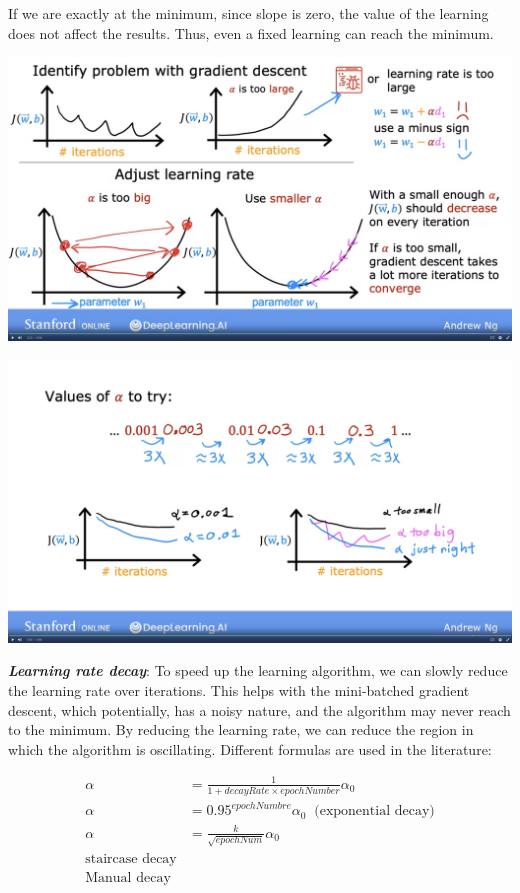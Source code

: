 \documentclass[12pt]{report}
\begin{document}
If we are exactly at the minimum, since slope is zero, the value of the learning does not affect the results. Thus, even a fixed learning can reach the minimum.

\includegraphics[scale=0.12]{pics/LearningRate.png}

\includegraphics[scale=0.12]{pics/learningrate2.png}

\textbf{\textit{Learning rate decay}}: To speed up the learning algorithm, we can slowly reduce the learning rate over iterations. This helps with the mini-batched gradient descent, which potentially, has a noisy nature, and the algorithm may never reach to the minimum. By reducing the learning rate, we can reduce the region in which the algorithm is oscillating. Different formulas are used in the literature:

\begin{align}
  \alpha &= \frac{1}{1+decayRate\times epochNumber} \alpha_0 \\
  \alpha &= 0.95^{epochNumbre} \alpha_0 \; \; \text{(exponential decay)} \\
  \alpha &= \frac{k}{\sqrt{epochNum}}  \alpha_0 \\
  \text{staircase decay} \\
  \text{Manual decay}
\end{align}
\end{document}
